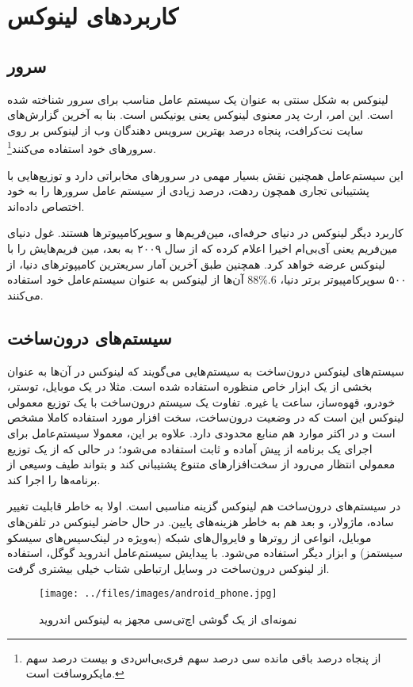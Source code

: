 \section{کاربردهای لینوکس}
\subsection*{سرور}
لینوکس به شکل سنتی به عنوان یک سیستم عامل مناسب برای سرور شناخته شده است. این امر، ارث پدر معنوی لینوکس یعنی یونیکس است. بنا به آخرین گزارش‌های سایت نت‌کرافت، پنجاه درصد بهترین سرویس دهندگان وب از لینوکس بر روی سرورهای خود استفاده می‌کنند\footnote{ از پنجاه درصد باقی مانده سی درصد سهم فری‌بی‌اس‌دی و بیست درصد سهم مایکروسافت است.}.

این سیستم‌عامل همچنین نقش بسیار مهمی در سرورهای مخابراتی دارد و توزیع‌هایی با پشتیبانی تجاری همچون ردهت، درصد زیادی از سیستم عامل سرورها را به خود اختصاص داده‌اند.

کاربرد دیگر لینوکس در دنیای حرفه‌ای، مین‌فریم‌ها و سوپرکامپیوترها هستند. غول دنیای مین‌فریم یعنی آی‌بی‌ام اخیرا اعلام کرده که از سال ۲۰۰۹ به بعد، مین فریم‌هایش را با لینوکس عرضه خواهد کرد. همچنین طبق آخرین آمار سریعترین کامیپوترهای دنیا، از ۵۰۰ سوپرکامپیوتر برتر دنیا،
6.\%88
آن‌ها از لینوکس به عنوان سیستم‌عامل خود استفاده می‌کنند.
\subsection*{سیستم‌های درون‌ساخت}
سیستم‌های لینوکس درون‌ساخت
به سیستم‌هایی می‌گویند که لینوکس در آن‌ها به عنوان بخشی از یک ابزار خاص منظوره استفاده شده است. مثلا در یک موبایل، توستر، خودرو، قهوه‌ساز، ساعت یا غیره. تفاوت یک سیستم درون‌ساخت با یک توزیع معمولی لینوکس این است که در وضعیت درون‌ساخت، سخت افزار مورد استفاده کاملا مشخص است و در اکثر موارد هم منابع محدودی دارد. علاوه بر این، معمولا سیستم‌عامل برای اجرای یک برنامه از پیش آماده و ثابت استفاده می‌شود؛ در حالی که از یک توزیع معمولی انتظار می‌رود از سخت‌افزارهای متنوع پشتیبانی کند و بتواند طیف وسیعی از برنامه‌ها را اجرا کند.

در سیستم‌های درون‌ساخت هم لینوکس گزینه مناسبی است. اولا به خاطر قابلیت تغییر ساده، ماژولار، و بعد هم به خاطر هزینه‌های پایین. در حال حاضر لینوکس در تلفن‌های موبایل، انواعی از روترها و فایروال‌های شبکه (به‌ویژه در لینک‌سیس‌های سیسکو سیستمز) و ابزار دیگر استفاده می‌شود. با پیدایش سیستم‌عامل اندروید گوگل، استفاده از لینوکس درون‌ساخت در وسایل ارتباطی شتاب خیلی بیشتری گرفت.
\begin{figure}[H]
	\begin{center}
		\texttt{[image: ../files/images/android\_phone.jpg]}
		\caption*{نمونه‌ای از یک گوشی اچ‌تی‌سی مجهز به لینوکس اندروید}
	\end{center}
\end{figure}
